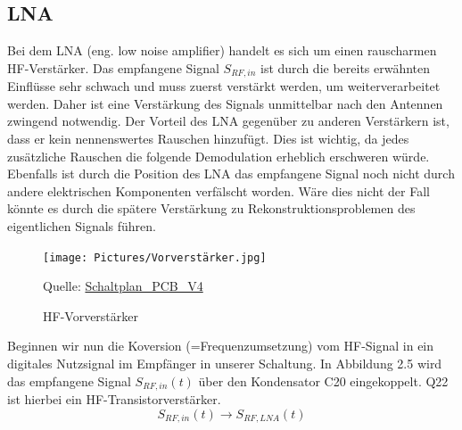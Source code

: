\subsection{LNA}
Bei dem LNA (eng. low noise amplifier) handelt es sich um einen rauscharmen HF-Verstärker. Das empfangene Signal $S_{RF,in}$ ist
durch die bereits erwähnten Einflüsse sehr schwach und muss  zuerst verstärkt werden, um weiterverarbeitet werden. Daher
ist eine Verstärkung des Signals unmittelbar nach den Antennen zwingend notwendig. Der Vorteil des LNA gegenüber zu
anderen Verstärkern ist, dass er kein nennenswertes Rauschen hinzufügt. Dies ist wichtig, da jedes zusätzliche Rauschen
die folgende Demodulation erheblich erschweren würde. Ebenfalls ist durch die Position des LNA das empfangene Signal noch
nicht durch andere elektrischen Komponenten verfälscht worden. Wäre dies nicht der Fall könnte es durch die spätere Verstärkung zu
Rekonstruktionsproblemen des eigentlichen Signals führen.
\begin{figure}[H]
    \centering
    \texttt{[image: Pictures/Vorverstärker.jpg]}
    \caption{HF-Vorverstärker}
    \footnotesize{Quelle: \url{Schaltplan_PCB_V4}}
\end{figure}


Beginnen wir nun die Koversion (=Frequenzumsetzung) vom HF-Signal in ein digitales Nutzsignal im Empfänger in unserer Schaltung. In Abbildung 2.5
wird das empfangene Signal $S_{RF,in}(t)$ über den Kondensator C20 eingekoppelt. Q22 ist hierbei ein HF-Transistorverstärker.\\
\[
S_{RF,in}(t) \rightarrow S_{RF,LNA}(t)
\]
